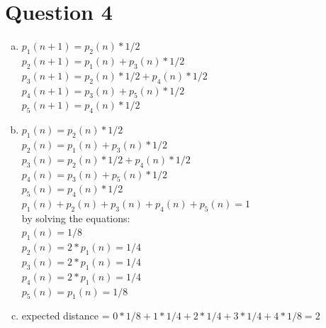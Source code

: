 \documentclass[11pt, a4paper]{article}
\begin{document}
\section*{Question 4}
\begin{enumerate}[(a)]
    \item
        $ p_1(n+1) = p_2(n) * 1/2$\\
        $ p_2(n+1) = p_1(n) + p_3(n) * 1/2$\\
        $ p_3(n+1) = p_2(n) * 1/2 + p_4(n) * 1/2$\\
        $ p_4(n+1) = p_3(n) + p_5(n) * 1/2$\\
        $ p_5(n+1) = p_4(n) * 1/2$
    \item
        $ p_1(n) = p_2(n) * 1/2$\\
        $ p_2(n) = p_1(n) + p_3(n) * 1/2$\\
        $ p_3(n) = p_2(n) * 1/2 + p_4(n) * 1/2$\\
        $ p_4(n) = p_3(n) + p_5(n) * 1/2$\\
        $ p_5(n) = p_4(n) * 1/2$\\
        $  p_1(n) +  p_2(n) +  p_3(n) +  p_4(n) +  p_5(n) = 1$\\
        by solving the equations:\\
        $ p_1(n) = 1/8 $\\
        $ p_2(n) = 2 * p_1(n) = 1/4 $\\
        $ p_3(n) = 2 * p_1(n) = 1/4 $\\
        $ p_4(n) = 2 * p_1(n) = 1/4 $\\
        $ p_5(n) = p_1(n) = 1/8 $
    \item
        expected distance = $0 * 1/8 + 1 * 1/4 + 2 * 1/4 + 3 * 1/4 + 4 * 1/8 = 2$
\end{enumerate}
\end{document}
